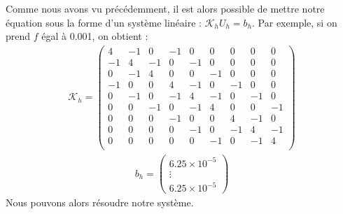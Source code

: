 Comme nous avons vu précédemment, il est alors possible de mettre notre équation sous la forme d'un système linéaire : $\mathcal{K}_{h}U_{h}=b_{h}$. Par exemple, si on prend $f$ égal à 0.001, on obtient :
\begin{align*}
\mathcal{K}_{h}=\left(
\begin{matrix}
4  &    -1    &  0   &   -1    &  0  &    0   &   0  &    0  &    0\\
-1   &   4  &    -1  &    0     & -1  &    0  &    0  &    0  &    0\\
0    &  -1    &  4   &   0    &  0   &   -1 &     0   &   0 &     0\\
-1  &    0   &   0    &  4   &   -1 &     0   &   -1  &    0  &    0\\
0  &    -1   &   0   &   -1  &    4    &  -1  &    0   &   -1  &    0\\
0   &   0  &    -1   &   0   &   -1  &    4   &   0  &    0  &    -1\\
0   &   0   &   0   &   -1    &  0    &  0  &    4   &   -1   &   0\\
0    &  0    &  0   &   0    &  -1    &  0   &   -1  &    4    &  -1\\
0    &  0  &    0   &   0    &  0   &   -1   &   0    &  -1   &   4\\
\end{matrix}\right)
\end{align*}
\begin{align*}
b_h =\left(
\begin{matrix}
6.25\times 10^{-5}\\
\vdots\\
6.25\times 10^{-5}
\end{matrix}\right)
\end{align*}
Nous pouvons alors résoudre notre système.